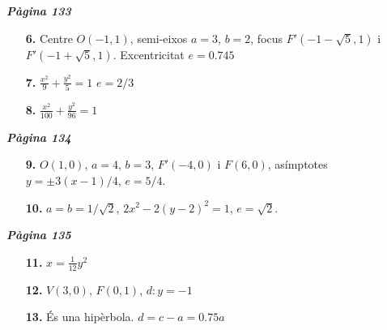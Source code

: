 \documentclass[a4paper, pdf, twoside]{book}
\begin{document}
\begin{multicols}{2}
{\textbf{\em Pàgina 133}} \hrulefill
\begin{enumerate}
\vspace{0.25cm}
\item[\fontfamily{phv}\selectfont\color{blue}\textbf{6. }]  \scalebox{0.6}{\simbolclau } 
Centre $O(-1,1)$, semi-eixos $a=3$, $b=2$, focus $F'(-1-\sqrt {5}, 1)$ i $F'(-1+\sqrt {5}, 1)$. Excentricitat $e=0.745$
 \end{enumerate}
\begin{enumerate}
\vspace{0.25cm}
\item[\fontfamily{phv}\selectfont\color{blue}\textbf{7. }]  \scalebox{0.6}{\simbolclau } 
$\frac {x^2}{9}+\frac {y^2}{5}=1$ $e=2/3$
\vspace{0.25cm}
\item[\fontfamily{phv}\selectfont\color{blue}\textbf{8. }]  \scalebox{0.6}{\simbolclau } 
$\frac {x^2}{100}+\frac {y^2}{96}=1$
 \end{enumerate}
\vspace{0.3cm}


{\textbf{\em Pàgina 134}} \hrulefill
\begin{enumerate}
\vspace{0.25cm}
\item[\fontfamily{phv}\selectfont\color{blue}\textbf{9. }]  \scalebox{0.6}{\simbolclau } 
$O(1,0)$, $a=4$, $b=3$, $F'(-4,0)$ i $F(6,0)$, asímptotes $y=\pm 3(x-1)/4$, $e=5/4$.
 \end{enumerate}
\begin{enumerate}
\vspace{0.25cm}
\item[\fontfamily{phv}\selectfont\color{blue}\textbf{10. }]  \scalebox{0.6}{\simbolclau } 
$a=b=1/\sqrt {2}$, $2{x^2}-2(y-2)^2=1$, $e=\sqrt {2}$.
 \end{enumerate}
\vspace{0.3cm}


{\textbf{\em Pàgina 135}} \hrulefill
\begin{enumerate}
\vspace{0.25cm}
\item[\fontfamily{phv}\selectfont\color{blue}\textbf{11. }]  \scalebox{0.6}{\simbolclau } 
$x=\frac {1}{12}y^2$
 \end{enumerate}
\begin{enumerate}
\vspace{0.25cm}
\item[\fontfamily{phv}\selectfont\color{blue}\textbf{12. }]  \scalebox{0.6}{\simbolclau } 
$V(3,0)$, $F(0, 1)$, $d: y=-1$
\vspace{0.25cm}
\item[\fontfamily{phv}\selectfont\color{blue}\textbf{13. }]  \scalebox{0.6}{\simbolclau } 
És una hipèrbola. $d=c-a=0.75 a$
 \end{enumerate}
\vspace{0.3cm}


\end{multicols}
\end{document}
